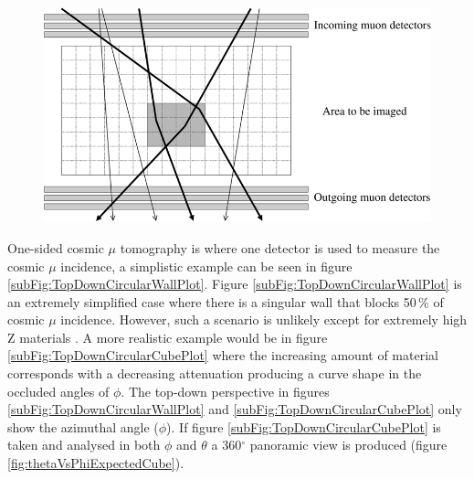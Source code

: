 \begin{figure}[!h]
 \centering
 \includegraphics[width=0.7\linewidth]{Chapter5/Figs/Raster/twoSidedCosmicMuon_schults2007.png}
 \label{fig:twoSidedCosmicMuonTomographySchults}
\end{figure}
 
 
 One-sided cosmic $\mu$ tomography is where one detector is used to measure the cosmic $\mu$ incidence, a simplistic example can be seen in figure \ref{subFig:TopDownCircularWallPlot}. Figure \ref{subFig:TopDownCircularWallPlot} is an extremely simplified case where there is a singular wall that blocks 50\,\% of cosmic $\mu$ incidence. However, such a scenario is unlikely except for extremely high Z materials \cite{schultz_2007}. A more realistic example would be in figure \ref{subFig:TopDownCircularCubePlot} where the increasing amount of material corresponds with a decreasing attenuation producing a curve shape in the occluded angles of $\phi$. The top-down perspective in figures \ref{subFig:TopDownCircularWallPlot} and \ref{subFig:TopDownCircularCubePlot} only show the azimuthal angle ($\phi$). If figure \ref{subFig:TopDownCircularCubePlot} is taken and analysed in both $\phi$ and $\theta$ a 360$^\circ$ panoramic view is produced (figure \ref{fig:thetaVsPhiExpectedCube}). 
 
